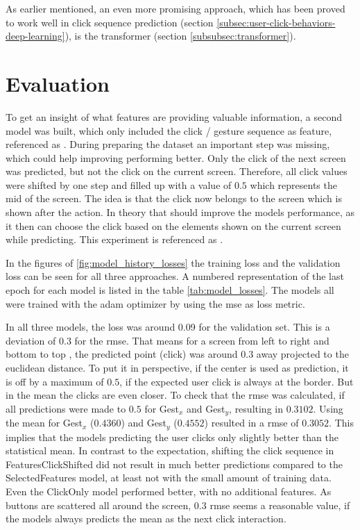 As earlier mentioned, an even more promising approach, which has been proved to work well in click sequence prediction (section \ref{subsec:user-click-behaviors-deep-learning}), is the transformer (section \ref{subsubsec:transformer}).

\section{Evaluation}

To get an insight of what features are providing valuable information, a second model was built, which only included the click / gesture sequence as feature, referenced as .
During preparing the dataset an important step was missing, which could help improving performing better.
Only the click of the next screen was predicted, but not the click on the current screen.
Therefore, all click values were shifted by one step and filled up with a value of $0.5$ which represents the mid of the screen.
The idea is that the click now belongs to the screen which is shown after the action.
In theory that should improve the models performance, as it then can choose the click based on the elements shown on the current screen while predicting.
This experiment is referenced as .

In the figures of \ref{fig:model_history_losses} the training loss and the validation loss can be seen for all three approaches.
A numbered representation of the last epoch for each model is listed in the table \ref{tab:model_losses}.
The models all were trained with the \gls{adam} optimizer by using the \gls{mse} as loss metric.

In all three models, the loss was around 0.09 for the validation set.
This is a deviation of 0.3 for the \gls{rmse}.
That means for a screen from left  to right  and bottom  to top , the predicted point (click) was around $0.3$ away projected to the euclidean distance.
To put it in perspective, if the center is used as prediction, it is off by a maximum of $0.5$, if the expected user click is always at the border.
But in the mean the clicks are even closer.
To check that the \gls{rmse} was calculated, if all predictions were made to $0.5$ for Gest$_x$ and Gest$_y$, resulting in $0.3102$.
Using the mean for Gest$_x$ ($0.4360$) and Gest$_y$ ($0.4552$) resulted in a \gls{rmse} of $0.3052$.
This implies that the models predicting the user clicks only slightly better than the statistical mean.
In contrast to the expectation, shifting the click sequence in FeaturesClickShifted did not result in much better predictions compared to the SelectedFeatures model, at least not with the small amount of training data.
Even the ClickOnly model performed better, with no additional features.
As buttons are scattered all around the screen, $0.3$ \gls{rmse} seems a reasonable value, if the models always predicts the mean as the next click interaction.

